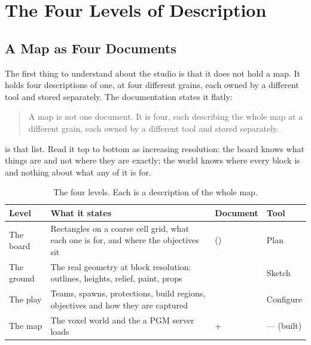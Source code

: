 \chapter{The Four Levels of Description}
\label{ch:four-levels}

\section{A Map as Four Documents}

The first thing to understand about the studio is that it does not hold a map. It
holds four descriptions of one, at four different grains, each owned by a
different tool and stored separately. The documentation states it flatly:

\begin{quote}
A map is not one document. It is four, each describing the whole map at a
different grain, each owned by a different tool and stored separately.
\end{quote}

 is that list. Read it top to bottom as increasing resolution:
the board knows what things are and not where they are exactly; the world knows
where every block is and nothing about what any of it is for.

\begin{table}[htbp]
\caption{The four levels. Each is a description of the whole map.}
\label{tab:levels}
\small
\begin{tabularx}{\textwidth}{L{2.1cm} Y L{3.1cm} L{1.9cm}}
\toprule
\textbf{Level} & \textbf{What it states} & \textbf{Document} & \textbf{Tool} \\
\midrule
The board &
  Rectangles on a coarse cell grid, what each one is for, and where the
  objectives sit &
   \newline () & Plan \\
The ground &
  The real geometry at block resolution: outlines, heights, relief, paint, props &
   & Sketch \\
The play &
  Teams, spawns, protections, build regions, objectives and how they are captured &
   & Configure \\
The map &
  The voxel world and the  a PGM server loads &
   +  & --- (built) \\
\bottomrule
\end{tabularx}
\end{table}

